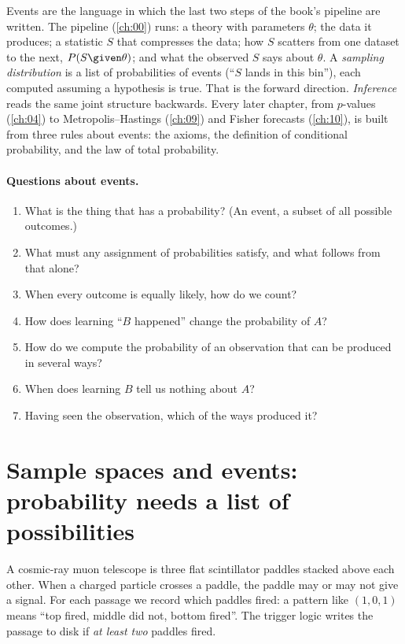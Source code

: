 Events are the language in which the last two steps of the book's pipeline are
written. The pipeline (\cref{ch:00}) runs: a theory with parameters $\theta$;
the data it produces; a statistic $S$ that compresses the data; how $S$ scatters
from one dataset to the next, $P(S\given\theta)$; and what the observed $S$ says
about $\theta$. A \emph{sampling distribution} is a list of probabilities of
events (``$S$ lands in this bin''), each computed assuming a hypothesis is true.
That is the forward direction. \emph{Inference} reads the same joint structure
backwards. Every later chapter, from $p$-values (\cref{ch:04}) to
Metropolis--Hastings (\cref{ch:09}) and Fisher forecasts (\cref{ch:10}), is
built from three rules about events: the axioms, the definition of conditional
probability, and the law of total probability.

\paragraph{Questions about events.}
\begin{enumerate}[leftmargin=1.5em,itemsep=1pt]
  \item What is the thing that has a probability? (An event, a subset of all
        possible outcomes.)
  \item What must any assignment of probabilities satisfy, and what follows
        from that alone?
  \item When every outcome is equally likely, how do we count?
  \item How does learning ``$B$ happened'' change the probability of $A$?
  \item How do we compute the probability of an observation that can be
        produced in several ways?
  \item When does learning $B$ tell us nothing about $A$?
  \item Having seen the observation, which of the ways produced it?
\end{enumerate}
\section{Sample spaces and events: probability needs a list of possibilities}
\label{1a:sec:events}

A cosmic-ray muon telescope is three flat scintillator paddles stacked above
each other. When a charged particle crosses a paddle, the paddle may or may not
give a signal. For each passage we record which paddles fired: a pattern like
$(1,0,1)$ means ``top fired, middle did not, bottom fired''. The trigger logic
writes the passage to disk if \emph{at least two} paddles fired.

